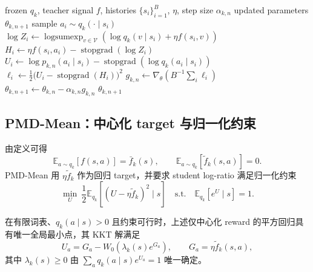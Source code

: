\begin{algorithm}[ht]
\caption{PMD-Part inner update\\{\small\textit{Semantics: 固定 anchor 下的完整 Gibbs log-ratio 回归}}}
\begin{algorithmic}[1]
\Require frozen $ q_k$, teacher signal $f$, histories $\{s_i\}_{i=1}^B$, $\eta$, step size $\alpha_{k,n}$
\Ensure updated parameters $\theta_{k,n+1}$
    \State sample $a_i\sim q_k(\cdot\mid s_i)$
    \State $\log Z_i\gets\operatorname{logsumexp}_{v\in\mathcal V}(\log q_k(v\mid s_i)+\eta f(s_i,v))$
    \State $H_i\gets\eta f(s_i,a_i)-\operatorname{stopgrad}(\log Z_i)$
    \State $U_i\gets\log p_{k,n}(a_i\mid s_i)-\operatorname{stopgrad}(\log q_k(a_i\mid s_i))$
    \State $\ell_i\gets\frac12\bigl(U_i-\operatorname{stopgrad}(H_i)\bigr)^2$
\EndFor
\State $g_{k,n}\gets\nabla_\theta(B^{-1}\sum_i\ell_i)$
\State $\theta_{k,n+1}\gets\theta_{k,n}-\alpha_{k,n}g_{k,n}$
\State \Return $\theta_{k,n+1}$
\end{algorithmic}
\end{algorithm}

\subsection{PMD-Mean：中心化 target 与归一化约束}
\label{sec:ch2-pmd-mean}

由定义可得
\begin{equation*}
\mathbb E_{a\sim q_k}[f(s,a)]=\bar f_k(s),
\qquad
\mathbb E_{a\sim q_k}[\widetilde f_k(s,a)]=0.
\end{equation*}
PMD-Mean 用 $\eta\widetilde f_k$ 作为回归 target，并要求 student log-ratio 满足归一化约束
\begin{equation}
\label{eq:ch2-mean-loss}
\min_{U}\ \frac12\mathbb E_{ q_k}\left[(U-\eta\widetilde f_k)^2\mid s\right]
\quad\text{s.t.}\quad
\mathbb E_{ q_k}[e^{U}\mid s]=1.
\end{equation}

\begin{theorem}
\label{thm:ch2-mean-lambert}
在有限词表、$ q_k(a\mid s)>0$ 且约束可行时，上述仅中心化 reward 的平方回归具有唯一全局最小点，其 KKT 解满足
\begin{equation}
\label{eq:ch2-mean-lambert-theorem}
U_a=G_a-W_0\!\left(\lambda_k(s)e^{G_a}\right),\qquad
G_a=\eta\widetilde f_k(s,a),
\end{equation}
其中 $\lambda_k(s)\geq0$ 由 $\sum_a q_k(a\mid s)e^{U_a}=1$ 唯一确定。
\end{theorem}

